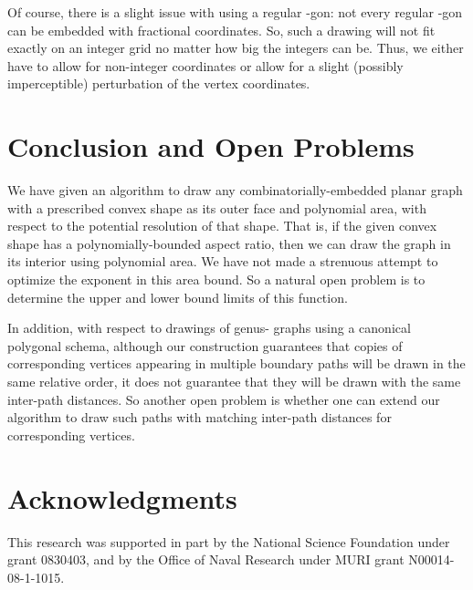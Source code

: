\documentclass[11pt]{article}
\begin{document}
Of course, there is a
  slight issue with using a regular -gon:
  not every regular -gon can be embedded with fractional
  coordinates.
  So, such a drawing will not fit exactly on an integer grid no matter how big the
  integers can be.
  Thus, we either have to allow for non-integer coordinates or allow
  for a slight (possibly imperceptible) perturbation of the vertex
  coordinates.

\section{Conclusion and Open Problems}
We have given an algorithm to draw any combinatorially-embedded
planar graph with a prescribed convex shape as its outer face and
polynomial area, with respect to the potential resolution of that
shape. That is, if the given convex shape has a polynomially-bounded
aspect ratio, then we can draw the graph  in its interior using
polynomial area.
We have not made a strenuous attempt to optimize the exponent in this
area bound. So a natural open problem is to determine the upper and
lower bound limits of this function.

In addition, with respect to drawings of genus- graphs using a
canonical polygonal schema, although our construction guarantees that
copies of corresponding
vertices appearing in multiple boundary paths
will be drawn in the same relative order,
it does not guarantee that they will be drawn with the same
inter-path distances.
So another open problem is whether one can extend our algorithm to
draw such paths with matching inter-path distances for corresponding
vertices.

\section*{Acknowledgments}
This research was supported in part by the National Science
Foundation under grant 0830403, and by the
Office of Naval Research under MURI grant N00014-08-1-1015.

\raggedright


\end{document}
